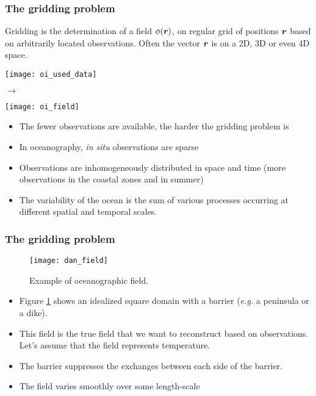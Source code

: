 
\begin{frame}
\frametitle{The gridding problem}

Gridding is the determination of a field $\phi(\mbox{\boldmath $ r $})$, on regular
grid of positions $\mbox{\boldmath $ r $}$ based on arbitrarily located
observations.  Often the vector $\mbox{\boldmath $ r $}$ is on a 2D, 3D or even 4D space.\\

\parbox[c]{.45\linewidth}{\texttt{[image: oi\_used\_data]}} $\rightarrow$
\parbox[c]{.45\linewidth}{\texttt{[image: oi\_field]}}

\begin{itemize} 
\item The fewer observations are available, the harder the gridding problem is
\item In oceanography, \textit{in situ} observations are sparse
\item Observations are inhomogeneously distributed in space and time (more observations in the coastal zones and in summer)
\item The variability of the ocean is the sum of various processes
occurring at different spatial and temporal scales. 
\end{itemize}

\end{frame}


\begin{frame}
\frametitle{The gridding problem}

\begin{figure}[H]
\centerline{\texttt{[image: dan\_field]}}
\caption{Example of oceanographic field.}
\label{dan_field}
\end{figure}

\vspace{-1cm}

\begin{itemize}
\item Figure \ref{dan_field} shows an idealized square domain with a barrier (\textit{e.g.} a peninsula or a dike).
\item  This field is the true field  that we want to reconstruct based on observations. Let's assume that the field
represents temperature. 
\item The barrier suppresses the exchanges between each side of the barrier.
\item The field varies smoothly over some length-scale
\end{itemize}

\end{frame}


